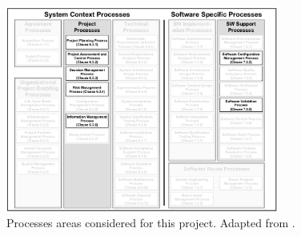 \begin{figure}[h!]
\centering
\includegraphics[width=0.8\textwidth]{img/ISO12207ProcessesImplemented.png}
\caption{Processes areas considered for this project. Adapted from \cite{ISO12207}.}
\end{figure}


